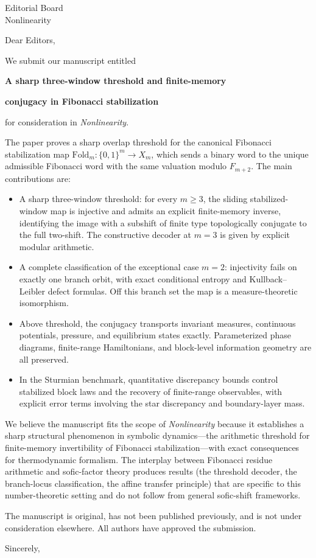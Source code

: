 \documentclass[11pt]{letter}
\date{\today}
\begin{document}
\begin{letter}{Editorial Board\\Nonlinearity}

\opening{Dear Editors,}

We submit our manuscript entitled

\medskip
\centerline{\textbf{A sharp three-window threshold and finite-memory}}
\centerline{\textbf{conjugacy in Fibonacci stabilization}}
\medskip

\noindent for consideration in \textit{Nonlinearity}.

The paper proves a sharp overlap threshold for the canonical Fibonacci stabilization map $\mathrm{Fold}_m:\{0,1\}^m\to X_m$, which sends a binary word to the unique admissible Fibonacci word with the same valuation modulo $F_{m+2}$. The main contributions are:

\begin{itemize}
\item A sharp three-window threshold: for every $m\ge 3$, the sliding stabilized-window map is injective and admits an explicit finite-memory inverse, identifying the image with a subshift of finite type topologically conjugate to the full two-shift. The constructive decoder at $m=3$ is given by explicit modular arithmetic.

\item A complete classification of the exceptional case $m=2$: injectivity fails on exactly one branch orbit, with exact conditional entropy and Kullback--Leibler defect formulas. Off this branch set the map is a measure-theoretic isomorphism.

\item Above threshold, the conjugacy transports invariant measures, continuous potentials, pressure, and equilibrium states exactly. Parameterized phase diagrams, finite-range Hamiltonians, and block-level information geometry are all preserved.

\item In the Sturmian benchmark, quantitative discrepancy bounds control stabilized block laws and the recovery of finite-range observables, with explicit error terms involving the star discrepancy and boundary-layer mass.
\end{itemize}

We believe the manuscript fits the scope of \textit{Nonlinearity} because it establishes a sharp structural phenomenon in symbolic dynamics---the arithmetic threshold for finite-memory invertibility of Fibonacci stabilization---with exact consequences for thermodynamic formalism. The interplay between Fibonacci residue arithmetic and sofic-factor theory produces results (the threshold decoder, the branch-locus classification, the affine transfer principle) that are specific to this number-theoretic setting and do not follow from general sofic-shift frameworks.

The manuscript is original, has not been published previously, and is not under consideration elsewhere. All authors have approved the submission.

\closing{Sincerely,}

\end{letter}
\end{document}
